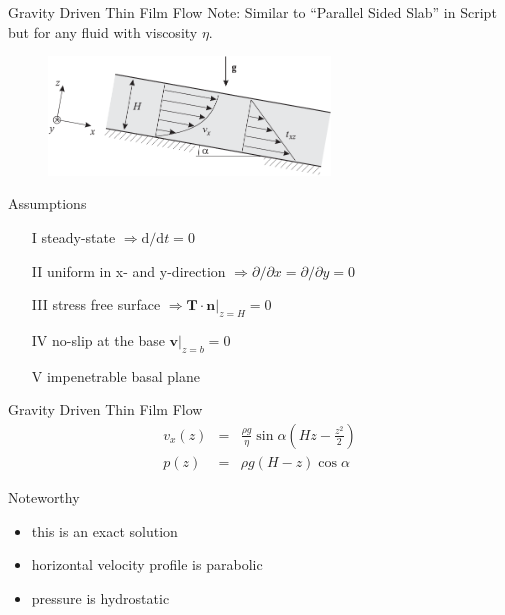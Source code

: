\documentclass[hide notes,intlimits,unknownkeysallowed]{beamer}
\newcommand{\bn}{\mathbf{n}}
\newcommand{\bv}{\mathbf{v}}
\newcommand{\epsdot}{\dot{\varepsilon}}
\begin{document}
\begin{frame}{Gravity Driven Thin Film Flow}
  \alert{Note}: Similar to ``Parallel Sided Slab'' in Script but for any fluid with viscosity $\eta$.
  \begin{figure}
    \includegraphics[width=7.5cm]{fig_3_11}
  \end{figure}
  \vspace{-1em}
  \begin{block}{Assumptions}
    \begin{itemize}
    \item[I] steady-state $\Rightarrow \mathrm{d} / \mathrm{d} t = 0$
    \item[II] uniform in x- and y-direction $\Rightarrow \partial / \partial x = \partial / \partial y = 0$
    \item[III] stress free surface $\Rightarrow \mathbf{T}\cdot \bn \vert_{z=H} = 0$
    \item[IV] no-slip at the base $\bv \vert_{z=b} = 0$
    \item[V] impenetrable basal plane 
    \end{itemize}
  \end{block}
\end{frame}

\begin{frame}{Gravity Driven Thin Film Flow}
\begin{equation*}
    \begin{array}{ccl}
      v_x (z) &  = & \frac{\rho g}{\eta} \sin{\alpha}\left(Hz - \frac{z^2}{2}\right) \\[1em]
      p(z) & = & \rho g \left(H - z\right)\cos{\alpha}
    \end{array}
  \end{equation*}
\begin{block}{Noteworthy}
\begin{itemize}
\item this is an \alert{exact} solution
\item horizontal velocity profile is \alert{parabolic}
\item pressure is \alert{hydrostatic}
\end{itemize}
\end{block}
\end{frame}
\end{document}
